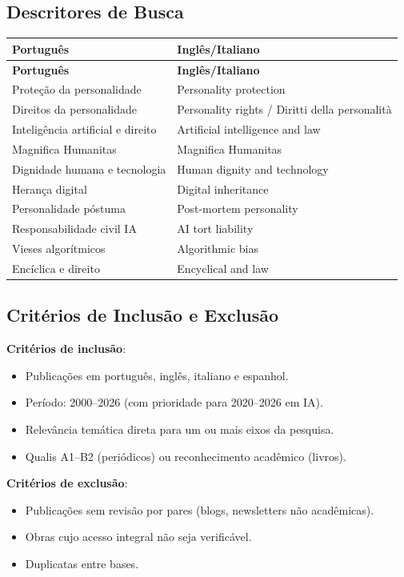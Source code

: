 \documentclass[12pt,a4paper]{article}
\begin{document}
\subsection{Descritores de Busca}

\medskip
{\small
\begin{longtable}{|p{5.5cm}|p{8cm}|}
\hline
\rowcolor[gray]{0.9}
\textbf{Português} & \textbf{Inglês/Italiano} \\
\hline
\endfirsthead
\hline
\rowcolor[gray]{0.9}
\textbf{Português} & \textbf{Inglês/Italiano} \\
\hline
\endhead
Proteção da personalidade & Personality protection \\
\hline
Direitos da personalidade & Personality rights / Diritti della personalità \\
\hline
Inteligência artificial e direito & Artificial intelligence and law \\
\hline
Magnifica Humanitas & Magnifica Humanitas \\
\hline
Dignidade humana e tecnologia & Human dignity and technology \\
\hline
Herança digital & Digital inheritance \\
\hline
Personalidade póstuma & Post-mortem personality \\
\hline
Responsabilidade civil IA & AI tort liability \\
\hline
Vieses algorítmicos & Algorithmic bias \\
\hline
Encíclica e direito & Encyclical and law \\
\hline
\end{longtable}
}

\subsection{Critérios de Inclusão e Exclusão}

\textbf{Critérios de inclusão}:
\begin{itemize}
\item Publicações em português, inglês, italiano e espanhol.
\item Período: 2000--2026 (com prioridade para 2020--2026 em IA).
\item Relevância temática direta para um ou mais eixos da pesquisa.
\item Qualis A1--B2 (periódicos) ou reconhecimento acadêmico (livros).
\end{itemize}

\textbf{Critérios de exclusão}:
\begin{itemize}
\item Publicações sem revisão por pares (blogs, newsletters não acadêmicas).
\item Obras cujo acesso integral não seja verificável.
\item Duplicatas entre bases.
\end{itemize}
\end{document}
